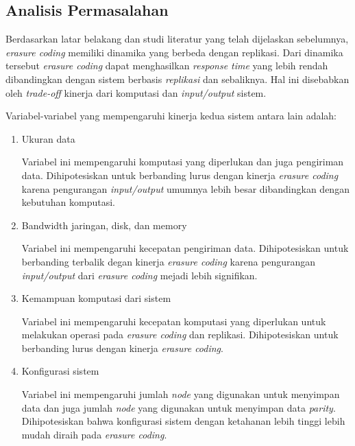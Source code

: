 \subsection{Analisis Permasalahan}
\label{subsection:analisis-permasalahan}


Berdasarkan latar belakang dan studi literatur yang telah dijelaskan sebelumnya, \textit{erasure coding} memiliki dinamika yang berbeda dengan replikasi. Dari dinamika tersebut \textit{erasure coding} dapat menghasilkan \textit{response time} yang lebih rendah dibandingkan dengan sistem berbasis \textit{replikasi} dan sebaliknya. Hal ini disebabkan oleh \textit{trade-off} kinerja dari komputasi dan \textit{input/output} sistem.

Variabel-variabel yang mempengaruhi kinerja kedua sistem antara lain adalah:
\begin{enumerate}
	\item Ukuran data

	      Variabel ini mempengaruhi komputasi yang diperlukan dan juga pengiriman data. Dihipotesiskan untuk berbanding lurus dengan kinerja \textit{erasure coding} karena pengurangan \textit{input/output} umumnya lebih besar dibandingkan dengan kebutuhan komputasi.

	\item Bandwidth jaringan, disk, dan memory

	      Variabel ini mempengaruhi kecepatan pengiriman data. Dihipotesiskan untuk berbanding terbalik degan kinerja \textit{erasure coding} karena pengurangan \textit{input/output} dari \textit{erasure coding} mejadi lebih signifikan.

	\item Kemampuan komputasi dari sistem

	      Variabel ini mempengaruhi kecepatan komputasi yang diperlukan untuk melakukan operasi pada \textit{erasure coding} dan replikasi. Dihipotesiskan untuk berbanding lurus dengan kinerja \textit{erasure coding}.

	\item Konfigurasi sistem

	      Variabel ini mempengaruhi jumlah \textit{node} yang digunakan untuk menyimpan data dan juga jumlah \textit{node} yang digunakan untuk menyimpan data \textit{parity}. Dihipotesiskan bahwa konfigurasi sistem dengan ketahanan lebih tinggi lebih mudah diraih pada \textit{erasure coding}.

\end{enumerate}

